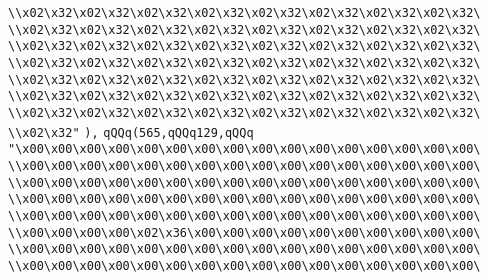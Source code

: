 \verb|\\x02\x32\x02\x32\x02\x32\x02\x32\x02\x32\x02\x32\x02\x32\x02\x32\|\newline
\verb|\\x02\x32\x02\x32\x02\x32\x02\x32\x02\x32\x02\x32\x02\x32\x02\x32\|\newline
\verb|\\x02\x32\x02\x32\x02\x32\x02\x32\x02\x32\x02\x32\x02\x32\x02\x32\|\newline
\verb|\\x02\x32\x02\x32\x02\x32\x02\x32\x02\x32\x02\x32\x02\x32\x02\x32\|\newline
\verb|\\x02\x32\x02\x32\x02\x32\x02\x32\x02\x32\x02\x32\x02\x32\x02\x32\|\newline
\verb|\\x02\x32\x02\x32\x02\x32\x02\x32\x02\x32\x02\x32\x02\x32\x02\x32\|\newline
\verb|\\x02\x32\x02\x32\x02\x32\x02\x32\x02\x32\x02\x32\x02\x32\x02\x32\|\newline
\verb|\\x02\x32"|\newline
\verb|),|\newline
\verb|qQQq(565,qQQq129,qQQq|\newline
\verb|"\x00\x00\x00\x00\x00\x00\x00\x00\x00\x00\x00\x00\x00\x00\x00\x00\|\newline
\verb|\\x00\x00\x00\x00\x00\x00\x00\x00\x00\x00\x00\x00\x00\x00\x00\x00\|\newline
\verb|\\x00\x00\x00\x00\x00\x00\x00\x00\x00\x00\x00\x00\x00\x00\x00\x00\|\newline
\verb|\\x00\x00\x00\x00\x00\x00\x00\x00\x00\x00\x00\x00\x00\x00\x00\x00\|\newline
\verb|\\x00\x00\x00\x00\x00\x00\x00\x00\x00\x00\x00\x00\x00\x00\x00\x00\|\newline
\verb|\\x00\x00\x00\x00\x02\x36\x00\x00\x00\x00\x00\x00\x00\x00\x00\x00\|\newline
\verb|\\x00\x00\x00\x00\x00\x00\x00\x00\x00\x00\x00\x00\x00\x00\x00\x00\|\newline
\verb|\\x00\x00\x00\x00\x00\x00\x00\x00\x00\x00\x00\x00\x00\x00\x00\x00\|\newline
